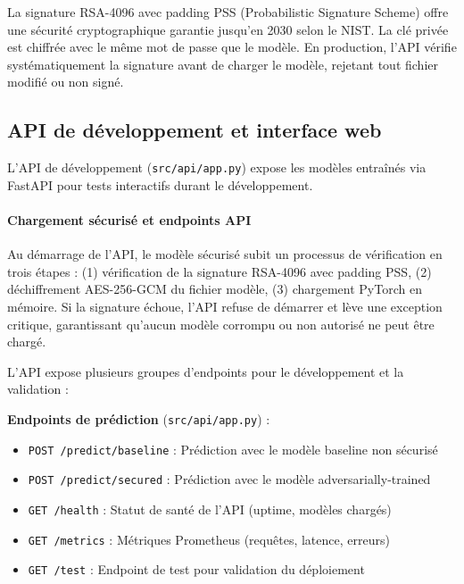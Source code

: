 La signature RSA-4096 avec padding PSS (Probabilistic Signature Scheme) offre une sécurité cryptographique garantie jusqu'en 2030 selon le NIST. La clé privée est chiffrée avec le même mot de passe que le modèle. En production, l'API vérifie systématiquement la signature avant de charger le modèle, rejetant tout fichier modifié ou non signé.


\subsection{API de développement et interface web}

L'API de développement (\texttt{src/api/app.py}) expose les modèles entraînés via FastAPI pour tests interactifs durant le développement.

\paragraph{Chargement sécurisé et endpoints API}

Au démarrage de l'API, le modèle sécurisé subit un processus de vérification en trois étapes : (1) vérification de la signature RSA-4096 avec padding PSS, (2) déchiffrement AES-256-GCM du fichier modèle, (3) chargement PyTorch en mémoire. Si la signature échoue, l'API refuse de démarrer et lève une exception critique, garantissant qu'aucun modèle corrompu ou non autorisé ne peut être chargé.

L'API expose plusieurs groupes d'endpoints pour le développement et la validation :

\textbf{Endpoints de prédiction} (\texttt{src/api/app.py}) :
\begin{itemize}
    \item \texttt{POST /predict/baseline} : Prédiction avec le modèle baseline non sécurisé
    \item \texttt{POST /predict/secured} : Prédiction avec le modèle adversarially-trained
    \item \texttt{GET /health} : Statut de santé de l'API (uptime, modèles chargés)
    \item \texttt{GET /metrics} : Métriques Prometheus (requêtes, latence, erreurs)
    \item \texttt{GET /test} : Endpoint de test pour validation du déploiement
\end{itemize}

